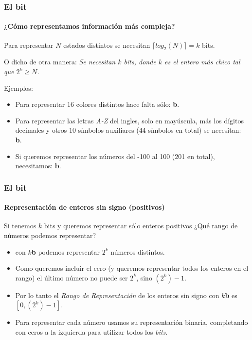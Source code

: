 \documentclass[11pt,a4paper,spanish]{beamer}
\newcommand{\bit}{\textbf{b}}
\begin{document}
\begin{frame}

\frametitle{El bit}
\framesubtitle{¿Cómo representamos información más compleja?}

    Para representar $N$ estados distintos se necesitan $\lceil{log_{2}(N)\rceil} =
    k$ bits.
    
    O dicho de otra manera: \emph{Se necesitan $k$ bits, donde $k$ es el
    entero más chico tal que $2^k\ge{}N$.}

    \pause
    Ejemplos:
    \begin{itemize}
        \item Para representar 16 colores distintos hace falta sólo: \bit. \pause
    \item Para representar las letras \emph{A-Z} del ingles, solo en
        mayúscula, más los dígitos decimales y otros 10 símbolos auxiliares
            (44 símbolos en total) se necesitan: \bit. \pause
        \item Si queremos representar los números del -100 al 100 (201 en
            total), necesitamos: \bit.
    \end{itemize}

\end{frame}

\begin{frame}

\frametitle{El bit}
\framesubtitle{Representación de enteros sin signo (positivos)}

    Si tenemos $k$ bits y queremos representar sólo enteros positivos ¿Qué
    rango de números podemos representar?

    \pause
    \begin{itemize}
        \item con $k$\bit{} podemos representar $2^{k}$ números distintos.
            \pause
        \item Como queremos incluir el cero (y queremos representar todos los
            enteros en el rango) el último número no puede ser $2^{k}$, sino
            $(2^{k})-1$. \pause
        \item Por lo tanto el \emph{Rango de Representación} de los enteros
            sin signo con $k$\bit{} es $[0,(2^{k})-1]$.\pause
        \item Para representar cada número usamos su representación binaria,
            completando con ceros a la izquierda para utilizar todos los
            \emph{bits}.
    \end{itemize}
\end{frame}
\end{document}
